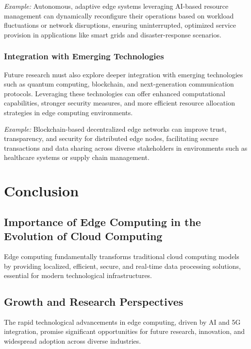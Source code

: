 \documentclass[runningheads]{llncs}
\begin{document}
\textit{Example:} Autonomous, adaptive edge systems leveraging AI-based resource management can dynamically reconfigure their operations based on workload fluctuations or network disruptions, ensuring uninterrupted, optimized service provision in applications like smart grids and disaster-response scenarios.

\subsubsection{Integration with Emerging Technologies}
Future research must also explore deeper integration with emerging technologies such as quantum computing, blockchain, and next-generation communication protocols. Leveraging these technologies can offer enhanced computational capabilities, stronger security measures, and more efficient resource allocation strategies in edge computing environments.

\textit{Example:} Blockchain-based decentralized edge networks can improve trust, transparency, and security for distributed edge nodes, facilitating secure transactions and data sharing across diverse stakeholders in environments such as healthcare systems or supply chain management.

\section{Conclusion}
\subsection{Importance of Edge Computing in the Evolution of Cloud Computing}
Edge computing fundamentally transforms traditional cloud computing models by providing localized, efficient, secure, and real-time data processing solutions, essential for modern technological infrastructures.

\subsection{Growth and Research Perspectives}
The rapid technological advancements in edge computing, driven by AI and 5G integration, promise significant opportunities for future research, innovation, and widespread adoption across diverse industries.
\end{document}
